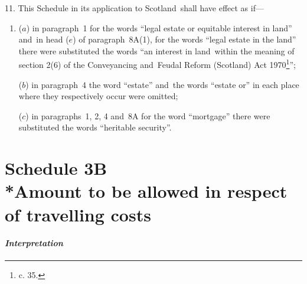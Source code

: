 \documentclass[12pt,a4paper]{article}
\begin{document}
11.  This Schedule in its application to Scotland~shall have effect as if—
\begin{enumerate}\item[]
($a$) in paragraph~1 for the words “legal estate or equitable interest in land” 
and~in head ($e$) of paragraph~8A(1), for the words “legal estate in the land”  %
there were substituted the words “an interest in land~within the meaning of section 2(6) of the Conveyancing and~Feudal Reform (Scotland) Act 1970\footnote{ c. 35.}”;

($b$) in paragraph~4 the word “estate” and~the words “estate or” in each place where they respectively occur were omitted;

($c$) in paragraphs~1, 2, 4 and~8A for the word “mortgage” there were substituted the words “heritable security”.
\end{enumerate}


\part[Schedule 3B --- Amount to be allowed in respect of travelling costs]{Schedule 3B\\*Amount to be allowed in respect of travelling costs}

\renewcommand\parthead{--- Schedule 3B}


\subsection*{\itshape Interpretation}
\end{document}
